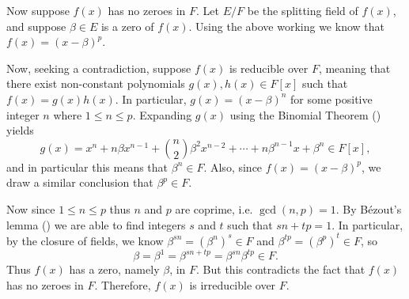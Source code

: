 \begin{questions}
    Now suppose $f(x)$ has no zeroes in $F$. Let $E/F$ be the splitting field of $f(x)$, and suppose $\beta \in E$ is a zero of $f(x)$. Using the above working we know that $f(x) = (x-\beta)^p$.

    Now, seeking a contradiction, suppose $f(x)$ is reducible over $F$, meaning that there exist non-constant polynomials $g(x), h(x) \in F[x]$ such that $f(x) = g(x)h(x)$. In particular, $g(x) = (x-\beta)^n$ for some positive integer $n$ where $1 \leq n \leq p$. Expanding $g(x)$ using the Binomial Theorem () yields
    \[
        g(x) = x^n + n\beta x^{n-1} + {n\choose2}\beta^2x^{n-2} + \cdots + n\beta^{n-1}x + \beta^n \in F[x],
    \]
    and in particular this means that $\beta^n \in F$. Also, since $f(x) = (x-\beta)^p$, we draw a similar conclusion that $\beta^p \in F$.

    Now since $1 \leq n \leq p$ thus $n$ and $p$ are coprime, i.e. $\gcd(n,p) = 1$. By B\'ezout's lemma () we are able to find integers $s$ and $t$ such that $sn + tp = 1$. In particular, by the closure of fields, we know $\beta^{sn} = \left(\beta^n\right)^s \in F$ and $\beta^{tp} = \left(\beta^p\right)^t \in F$, so
    \[
        \beta = \beta^1 = \beta^{sn+tp} = \beta^{sn}\beta^{tp} \in F.
    \]
    Thus $f(x)$ has a zero, namely $\beta$, in $F$. But this contradicts the fact that $f(x)$ has no zeroes in $F$. Therefore, $f(x)$ is irreducible over $F$.
\end{questions}
